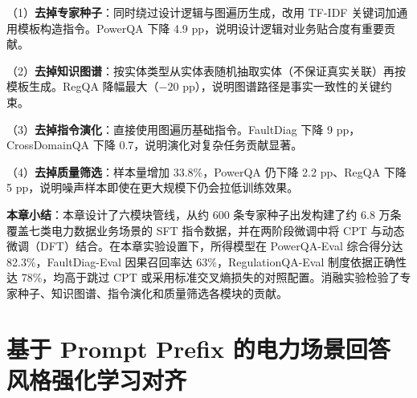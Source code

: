 \documentclass[fontset=fandol,type=master,campus=shenzhen,etitleauto=true]{hithesisbook}
\begin{document}
（1）\textbf{去掉专家种子}：同时绕过设计逻辑与图遍历生成，改用 TF-IDF 关键词加通用模板构造指令。PowerQA 下降 4.9 pp，说明设计逻辑对业务贴合度有重要贡献。

（2）\textbf{去掉知识图谱}：按实体类型从实体表随机抽取实体（不保证真实关联）再按模板生成。RegQA 降幅最大（$-20$ pp），说明图谱路径是事实一致性的关键约束。

（3）\textbf{去掉指令演化}：直接使用图遍历基础指令。FaultDiag 下降 9 pp，CrossDomainQA 下降 0.7，说明演化对复杂任务贡献显著。

（4）\textbf{去掉质量筛选}：样本量增加 33.8\%，PowerQA 仍下降 2.2 pp、RegQA 下降 5 pp，说明噪声样本即使在更大规模下仍会拉低训练效果。

\begin{table}[htbp]
\centering
\caption{SFT数据合成管线消融实验结果}
\label{tab:sft-ablation}
\small
{}
\end{table}

\vspace{0.5cm}
\noindent \textbf{本章小结}：本章设计了六模块管线，从约 600 条专家种子出发构建了约 6.8 万条覆盖七类电力数据业务场景的 SFT 指令数据，并在两阶段微调中将 CPT 与动态微调（DFT）结合。在本章实验设置下，所得模型在 PowerQA-Eval 综合得分达 82.3\%，FaultDiag-Eval 因果召回率达 63\%，RegulationQA-Eval 制度依据正确性达 78\%，均高于跳过 CPT 或采用标准交叉熵损失的对照配置。消融实验检验了专家种子、知识图谱、指令演化和质量筛选各模块的贡献。

\chapter{基于 Prompt Prefix 的电力场景回答风格强化学习对齐}\label{ux57faux4e8e-prompt-prefix-ux7684ux7535ux529bux573aux666fux56deux7b54ux98ceux683cux5f3aux5316ux5b66ux4e60ux5bf9ux9f50}
\end{document}
